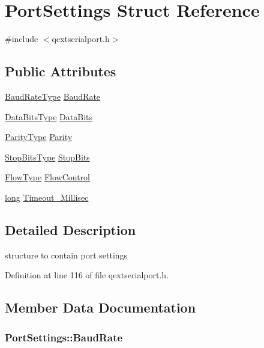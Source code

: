\hypertarget{struct_port_settings}{\section{Port\-Settings Struct Reference}
\label{struct_port_settings}
}


{\ttfamily \#include $<$qextserialport.\-h$>$}

\subsection*{Public Attributes}
\begin{DoxyCompactItemize}
\item 
\hyperlink{qextserialport_8h_a6f031169a6a9b150b5af707bb23cf010}{Baud\-Rate\-Type} \hyperlink{struct_port_settings_abe617f3545d6be4587e1a0700a0b0e5b}{Baud\-Rate}
\item 
\hyperlink{qextserialport_8h_a189ef78c2c1b7537ab114d576f6214fa}{Data\-Bits\-Type} \hyperlink{struct_port_settings_a9ec9d5a304b2ac8d3a100d07bce7c0b6}{Data\-Bits}
\item 
\hyperlink{qextserialport_8h_aee22d32d87c815090354bf9b8e957ace}{Parity\-Type} \hyperlink{struct_port_settings_a8d0bfbdcb40e9e3919e3f9829ae72582}{Parity}
\item 
\hyperlink{qextserialport_8h_adc8078895cd941d755d46633b54d3e7f}{Stop\-Bits\-Type} \hyperlink{struct_port_settings_a0752c70eb7e12f02ddf59739a056b04c}{Stop\-Bits}
\item 
\hyperlink{qextserialport_8h_a02ad1c7cf791a069dd54e409f8db4790}{Flow\-Type} \hyperlink{struct_port_settings_a10720f6217b8d8b90c326ea030c43e30}{Flow\-Control}
\item 
\hyperlink{ioapi_8h_a3c7b35ad9dab18b8310343c201f7b27e}{long} \hyperlink{struct_port_settings_a7147addae7fce6e8e4b302014967a0db}{Timeout\-\_\-\-Millisec}
\end{DoxyCompactItemize}


\subsection{Detailed Description}
structure to contain port settings 

Definition at line 116 of file qextserialport.\-h.



\subsection{Member Data Documentation}
\hypertarget{struct_port_settings_abe617f3545d6be4587e1a0700a0b0e5b}{
\subsubsection[{Baud\-Rate}]{ Port\-Settings\-::\-Baud\-Rate}}\label{struct_port_settings_abe617f3545d6be4587e1a0700a0b0e5b}


